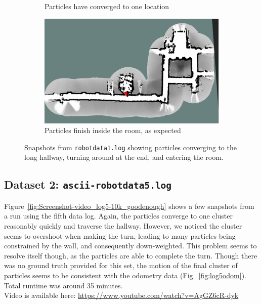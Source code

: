 \begin{figure}[h]
\begin{subfigure}[b]{0.49\textwidth}
\caption{Particles have converged to one location}
\label{fig:Screenshot-video_log1-10k_good-3}
\end{subfigure}
\begin{subfigure}[b]{0.49\textwidth}
\includegraphics[width=\linewidth]{figures/Screenshot-video_log1-10k_good-4}
\caption{Particles finish inside the room, as expected}
\label{fig:Screenshot-video_log1-10k_good-4}
\end{subfigure}
\caption{Snapshots from \texttt{robotdata1.log} showing particles converging to the long hallway, turning around at the end, and entering the room.
\label{fig:Screenshot-video_log1-10k_good}}
\end{figure}



\subsection{Dataset 2: \texttt{ascii-robotdata5.log}}

Figure~\ref{fig:Screenshot-video_log5-10k_goodenough} shows a few snapshots from a run using the fifth data log. Again, the particles converge to one cluster reasonably quickly and traverse the hallway. However, we noticed the cluster seems to overshoot when making the turn, leading to many particles being constrained by the wall, and consequently down-weighted. This problem seems to resolve itself though, as the particles are able to complete the turn. Though there was no ground truth provided for this set, the motion of the final cluster of particles seems to be consistent with the odometry data (Fig.~\ref{fig:log5odom}). Total runtime was around 35 minutes.\\
Video is available here:  \url{https://www.youtube.com/watch?v=AgGZ6cR-dyk}


